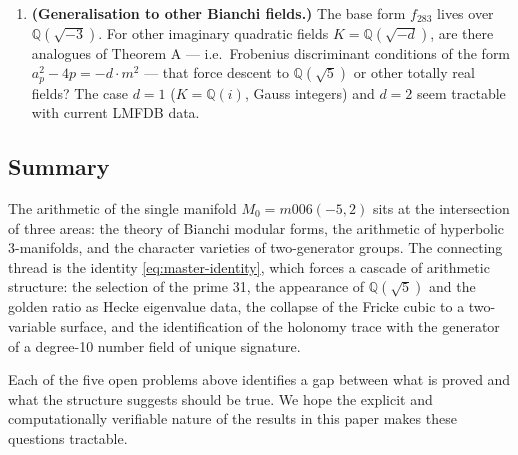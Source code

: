 \begin{enumerate}[(1)]
\item \textbf{(Generalisation to other Bianchi fields.)}
The base form $f_{283}$ lives over $\mathbb{Q}(\sqrt{-3})$. For other
imaginary quadratic fields $K = \mathbb{Q}(\sqrt{-d})$, are there
analogues of Theorem A — i.e.\ Frobenius discriminant conditions of the
form $a_p^2 - 4p = -d \cdot m^2$ — that force descent to $\mathbb{Q}(\sqrt{5})$
or other totally real fields? The case $d = 1$ ($K = \mathbb{Q}(i)$, Gauss
integers) and $d = 2$ seem tractable with current LMFDB data.

\end{enumerate}

\subsection{Summary}

The arithmetic of the single manifold $M_0 = m006(-5,2)$ sits at the
intersection of three areas: the theory of Bianchi modular forms,
the arithmetic of hyperbolic 3-manifolds, and the character varieties
of two-generator groups.
The connecting thread is the identity \eqref{eq:master-identity}, which
forces a cascade of arithmetic structure: the selection of the prime 31,
the appearance of $\mathbb{Q}(\sqrt{5})$ and the golden ratio as Hecke
eigenvalue data, the collapse of the Fricke cubic to a two-variable surface,
and the identification of the holonomy trace with the generator of a
degree-10 number field of unique signature.

Each of the five open problems above identifies a gap between what is
proved and what the structure suggests should be true. We hope the explicit
and computationally verifiable nature of the results in this paper makes
these questions tractable.
